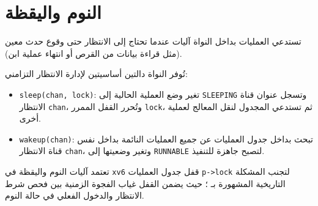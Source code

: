 \chapter{النوم واليقظة}
\label{chap:sleep}

تستدعي العمليات بداخل النواة آليات  عندما تحتاج إلى الانتظار حتى وقوع حدث معين (مثل قراءة بيانات من القرص أو انتهاء عملية ابن).

تُوفر النواة دالتين أساسيتين لإدارة الانتظار التزامني:
\begin{itemize}
\item \texttt{sleep(chan, lock)}: تغير وضع العملية الحالية إلى \texttt{SLEEPING} وتسجل عنوان قناة الانتظار \texttt{chan}، وتُحرر القفل الممرر \texttt{lock}، ثم تستدعي المجدول لنقل المعالج لعملية أخرى.
\item \texttt{wakeup(chan)}: تبحث بداخل جدول العمليات عن جميع العمليات النائمة بداخل نفس قناة الانتظار \texttt{chan}، وتغير وضعيتها إلى \texttt{RUNNABLE} لتصبح جاهزة للتنفيذ.
\end{itemize}

تعتمد آليات النوم واليقظة في \texttt{xv6} قفل جدول العمليات \texttt{p->lock} لتجنب المشكلة التاريخية المشهورة بـ ؛
حيث يضمن القفل غياب الفجوة الزمنية بين فحص شرط الانتظار والدخول الفعلي في حالة النوم.
